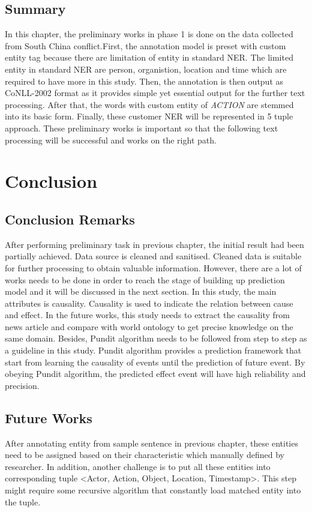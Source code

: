 \documentclass[twoside]{utmthesis}
\begin{document}
\section{Summary}
In this chapter, the preliminary works in phase 1 is done on the data collected from South China conflict.First, the annotation model is preset with custom entity tag because there are limitation of entity in standard NER. The limited entity in standard NER are person, organistion, location and time which are required to have more in this study. Then, the annotation is then output as CoNLL-2002 format as it provides simple yet essential output for the further text processing. After that, the words with custom entity of \textit{ACTION} are stemmed into its basic form. Finally, these customer NER will be represented in 5 tuple approach. These preliminary works is important so that the following text processing will be successful and works on the right path.  

\chapter{Conclusion}
\section{Conclusion Remarks}
After performing preliminary task in previous chapter, the initial result had been partially achieved. Data source is cleaned and sanitised.  Cleaned data is suitable for further processing to obtain valuable information. However, there are a lot of works needs to be done in order to reach the stage of building up prediction model and it will be discussed in the next section. In this study, the main attributes is causality. Causality is used to indicate the relation between cause and effect. In the future works, this study needs to extract the causality from news article and compare with world ontology to get precise knowledge on the same domain. Besides, Pundit algorithm needs to be followed from step to step as a guideline in this study. Pundit algorithm provides a prediction framework that start from learning the causality of events until the prediction of future event. By obeying Pundit algorithm, the predicted effect event will have high reliability and precision. 

\section{Future Works}
After annotating entity from sample sentence in previous chapter, these entities need to be assigned based on their characteristic which manually defined by researcher. In addition, another challenge is to put all these entities into corresponding tuple <Actor, Action, Object, Location, Timestamp>. This step might require some recursive algorithm that constantly load matched entity into the tuple.
\end{document}
